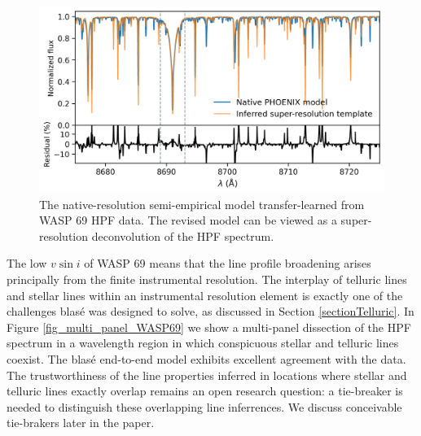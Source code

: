 \documentclass[twocolumn]{aastex631}
\begin{document}
\begin{figure}[hbt!]
    \centering
    \includegraphics[width=0.98\columnwidth]{figures/blase_super_resolution_template.png}
    \caption{The native-resolution semi-empirical model transfer-learned from WASP 69 HPF data. The revised model can be viewed as a super-resolution deconvolution of the HPF spectrum.}
    \label{fig_WASP69_regularized}
\end{figure}


The low $v\sin{i}$ of WASP 69 means that the line profile broadening arises principally from the finite instrumental resolution.  The interplay of telluric lines and stellar lines within an instrumental resolution element is exactly one of the challenges blas\'e was designed to solve, as discussed in Section \ref{sectionTelluric}.  In Figure \ref{fig_multi_panel_WASP69} we show a multi-panel dissection of the HPF spectrum in a wavelength region in which conspicuous stellar and telluric lines coexist.  The blas\'e end-to-end model exhibits excellent agreement with the data.  The trustworthiness of the line properties inferred in locations where stellar and telluric lines exactly overlap remains an open research question: a tie-breaker is needed to distinguish these overlapping line inferrences.  We discuss conceivable tie-brakers later in the paper.
\end{document}
